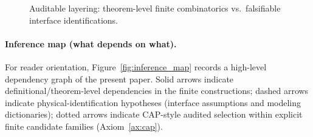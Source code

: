\begin{figure}[t]
\centering
{}
\caption{Auditable layering: theorem-level finite combinatorics vs.\ falsifiable interface identifications.}
\label{fig:auditable_layering}
\end{figure}

\paragraph{Inference map (what depends on what).}
For reader orientation, Figure~\ref{fig:inference_map} records a high-level dependency graph of the present paper.
Solid arrows indicate definitional/theorem-level dependencies in the finite constructions; dashed arrows indicate physical-identification hypotheses (interface assumptions and modeling dictionaries); dotted arrows indicate CAP-style audited selection within explicit finite candidate families (Axiom~\ref{ax:cap}).

